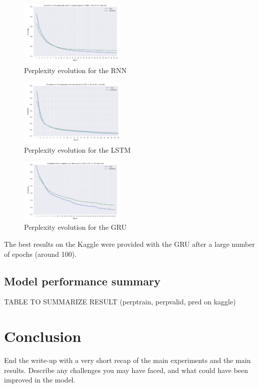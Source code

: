 \documentclass[11pt]{article}
\begin{document}
\begin{figure}[H]
\begin{center}
    \includegraphics[width=0.45\textwidth]{perp_rnn.png}
    \caption{Perplexity evolution for the RNN}
\end{center}
\end{figure}

\begin{figure}[H]
\begin{center}
    \includegraphics[width=0.45\textwidth]{perp_lstm.png}
    \caption{Perplexity evolution for the LSTM}
\end{center}
\end{figure}

\begin{figure}[H]
\begin{center}
    \includegraphics[width=0.45\textwidth]{perp_gru.png}
    \caption{Perplexity evolution for the GRU}
\end{center}
\end{figure}

The best results on the Kaggle were provided with the GRU after a large number of epochs (around 100).


\subsection{Model performance summary}

TABLE TO SUMMARIZE RESULT (perptrain, perpvalid, pred on kaggle)


\section{Conclusion}

End the write-up with a very short recap of the main experiments and the main results. Describe any challenges you may have faced, and what could have been improved in the model.



\end{document}
